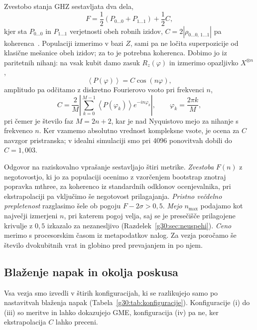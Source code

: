 Zvestobo stanja GHZ sestavljata dva dela,
\begin{equation}
F = \frac{1}{2}\left(P_{0\ldots0} + P_{1\ldots1}\right) + \frac{1}{2}C,
\label{g30:eq:zvestoba}
\end{equation}
kjer sta $P_{0\ldots0}$ in $P_{1\ldots1}$ verjetnosti obeh robnih izidov, $C = 2\left|\rho_{0\ldots0,\,1\ldots1}\right|$ pa koherenca~\cite{g30:monz2011, g30:wei2020}. Populaciji izmerimo v bazi $Z$, sami pa ne ločita superpozicije od klasične mešanice obeh izidov; za to je potrebna koherenca. Dobimo jo iz paritetnih nihanj: na vsak kubit damo zasuk $R_z(\varphi)$ in izmerimo opazljivko $X^{\otimes n}$,
\begin{equation}
\left\langle P(\varphi) \right\rangle = C \cos(n\varphi),
\label{g30:eq:pariteta}
\end{equation}
amplitudo pa odčitamo z diskretno Fourierovo vsoto pri frekvenci $n$,
\begin{equation}
C = \frac{2}{M}\left| \sum_{k=0}^{M-1} \left\langle P(\varphi_k) \right\rangle e^{-i n \varphi_k} \right|,
\qquad \varphi_k = \frac{2\pi k}{M},
\label{g30:eq:dft}
\end{equation}
pri čemer je število faz $M = 2n+2$, kar je nad Nyquistovo mejo za nihanje s frekvenco $n$. Ker vzamemo absolutno vrednost kompleksne vsote, je ocena za $C$ navzgor pristranska; v idealni simulaciji smo pri 4096 ponovitvah dobili do $C = 1{,}003$.

Odgovor na raziskovalno vprašanje sestavljajo štiri metrike. \emph{Zvestoba} $F(n)$ z negotovostjo, ki jo za populaciji ocenimo z vzorčenjem bootstrap znotraj popravka mthree, za koherenco iz standardnih odklonov ocenjevalnika, pri ekstrapolaciji pa vključimo še negotovost prilagajanja. \emph{Pristno večdelno prepletenost} razglasimo šele ob pogoju $F - 2\sigma > 0{,}5$. \emph{Mejo} $n_{\mathrm{max}}$ podajamo kot največji izmerjeni $n$, pri katerem pogoj velja, saj se je presečišče prilagojene krivulje z $0{,}5$ izkazalo za nezanesljivo (Razdelek~\ref{g30:sec:neuspehi}). \emph{Ceno} merimo s procesorskim časom iz metapodatkov nalog. Za vezja poročamo še število dvokubitnih vrat in globino pred prevajanjem in po njem.

\subsection{Blaženje napak in okolja poskusa}
\label{g30:sec:blazenje}

Vsa vezja smo izvedli v štirih konfiguracijah, ki se razlikujejo samo po nastavitvah blaženja napak (Tabela~\ref{g30:tab:konfiguracije}). Konfiguracije (i) do (iii) so meritve in lahko dokazujejo GME, konfiguracija (iv) pa ne, ker ekstrapolacija $C$ lahko preceni.

